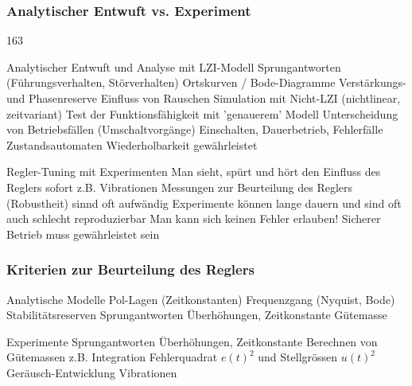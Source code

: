 \subsubsection{Analytischer Entwuft vs. Experiment}{163}

\begin{minipage}[t]{0.48\columnwidth}
    \begin{outline}
        \1 Analytischer Entwuft und Analyse mit LZI-Modell
            \2 Sprungantworten (Führungsverhalten, Störverhalten)
            \2 Ortskurven / Bode-Diagramme
            \2 Verstärkungs- und Phasenreserve
            \2 Einfluss von Rauschen
        \1 Simulation mit Nicht-LZI (nichtlinear, zeitvariant)
            \2 Test der Funktionsfähigkeit mit 'genauerem' Modell
            \2 Unterscheidung von Betriebsfällen (Umschaltvorgänge)
                \3 Einschalten, Dauerbetrieb, Fehlerfälle
                \3 Zustandsautomaten
            \2 Wiederholbarkeit gewährleistet
    \end{outline}
\end{minipage}
\hfill
\begin{minipage}[t]{0.48\columnwidth}
    \begin{outline}
        \1 Regler-Tuning mit Experimenten
            \2 Man sieht, spürt und hört den Einfluss des Reglers sofort
                \3 z.B. Vibrationen
            \2 Messungen zur Beurteilung des Reglers (Robustheit) sinnd oft aufwändig
            \2 Experimente können lange dauern und sind oft auch schlecht reproduzierbar
            \2 Man kann sich keinen Fehler erlauben!
                \3 Sicherer Betrieb muss gewährleistet sein
    \end{outline}
\end{minipage}


\subsubsection{Kriterien zur Beurteilung des Reglers}

\begin{minipage}[t]{0.48\columnwidth}
    \begin{outline}
        \1 Analytische Modelle
            \2 Pol-Lagen (Zeitkonstanten)
            \2 Frequenzgang (Nyquist, Bode)
            \2 Stabilitätsreserven
            \2 Sprungantworten 
                \3 Überhöhungen, Zeitkonstante
            \2 Gütemasse
    \end{outline}
\end{minipage}
\hfill
\begin{minipage}[t]{0.48\columnwidth}
    \begin{outline}
        \1 Experimente
            \2 Sprungantworten
                \3 Überhöhungen, Zeitkonstante
            \2 Berechnen von Gütemassen 
                \3 z.B. Integration Fehlerquadrat $e(t)^2$ und Stellgrössen $u(t)^2$
            \2 Geräusch-Entwicklung
            \2 Vibrationen
    \end{outline}
\end{minipage}


